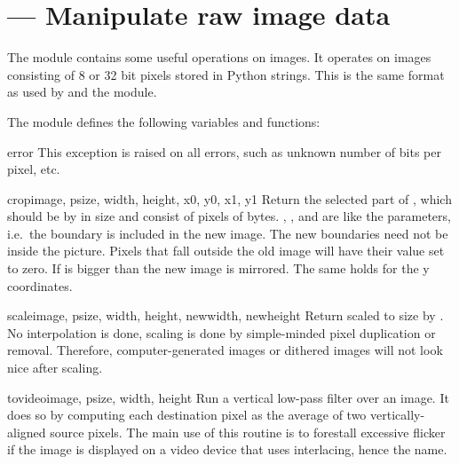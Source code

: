 \section{ ---
         Manipulate raw image data}



The  module contains some useful operations on images.
It operates on images consisting of 8 or 32 bit pixels stored in
Python strings.  This is the same format as used by
 and the  module.

The module defines the following variables and functions:

\begin{excdesc}{error}
This exception is raised on all errors, such as unknown number of bits
per pixel, etc.
\end{excdesc}


\begin{funcdesc}{crop}{image, psize, width, height, x0, y0, x1, y1}
Return the selected part of , which should be
 by  in size and consist of pixels of
 bytes. , ,  and  are like
the  parameters, i.e.\ the boundary is
included in the new image.  The new boundaries need not be inside the
picture.  Pixels that fall outside the old image will have their value
set to zero.  If  is bigger than  the new image is
mirrored.  The same holds for the y coordinates.
\end{funcdesc}

\begin{funcdesc}{scale}{image, psize, width, height, newwidth, newheight}
Return  scaled to size  by .
No interpolation is done, scaling is done by simple-minded pixel
duplication or removal.  Therefore, computer-generated images or
dithered images will not look nice after scaling.
\end{funcdesc}

\begin{funcdesc}{tovideo}{image, psize, width, height}
Run a vertical low-pass filter over an image.  It does so by computing
each destination pixel as the average of two vertically-aligned source
pixels.  The main use of this routine is to forestall excessive
flicker if the image is displayed on a video device that uses
interlacing, hence the name.
\end{funcdesc}

